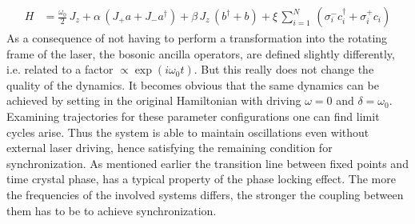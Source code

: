 \begin{align*}
    H &= \frac{\omega_0}{2}\,J_z +\alpha\,(J_+a + J_-a^\dagger)+ \beta\,J_z\,(b^\dagger+b)+\xi\,\sum_{i=1}^N\,(\sigma_i^-c_i^\dagger+\sigma_i^+c_i)
\end{align*}
As a consequence of not having to perform a transformation into the rotating frame of the laser, the bosonic ancilla operators, are defined slightly differently, i.e. related to a factor $\propto\exp(i\omega_0t)$. But this really does not change the quality of the dynamics. It becomes obvious that the same dynamics can be achieved by setting in the original Hamiltonian with driving $\omega=0$ and $\delta=\omega_0$. Examining trajectories for these parameter configurations one can find limit cycles arise. Thus the system is able to maintain oscillations even without external laser driving, hence satisfying the remaining condition for synchronization. As mentioned earlier the transition line between fixed points and time crystal phase, has a typical property of the phase locking effect. The more the frequencies of the involved systems differs, the stronger the coupling between them has to be to achieve synchronization. 
